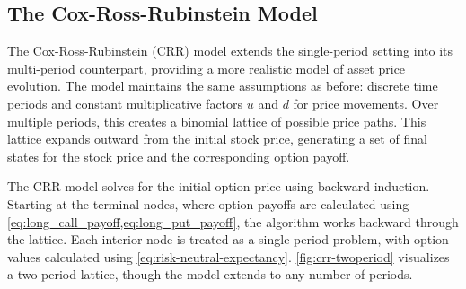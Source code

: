 \documentclass[english,12pt,a4paper,pdftex,sci,utf8]{aaltothesis}
\begin{document}
\subsection{The Cox-Ross-Rubinstein Model}

The Cox-Ross-Rubinstein (CRR) model \cite{cox1979option} extends the single-period setting into its multi-period counterpart, providing a more realistic model of asset price evolution. The model maintains the same assumptions as before: discrete time periods and constant multiplicative factors $u$ and $d$ for price movements. Over multiple periods, this creates a binomial lattice of possible price paths. This lattice expands outward from the initial stock price, generating a set of final states for the stock price and the corresponding option payoff.

The CRR model solves for the initial option price using backward induction. Starting at the terminal nodes, where option payoffs are calculated using \cref{eq:long_call_payoff,eq:long_put_payoff}, the algorithm works backward through the lattice. Each interior node is treated as a single-period problem, with option values calculated using \cref{eq:risk-neutral-expectancy}. \cref{fig:crr-twoperiod} visualizes a two-period lattice, though the model extends to any number of periods.
\end{document}
